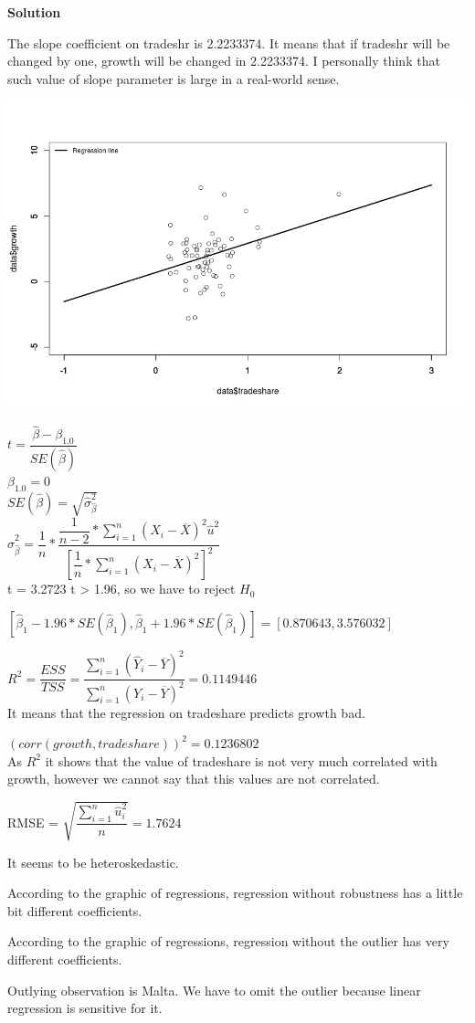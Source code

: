 \documentclass[12pt]{article}
\begin{document}
\textbf{Solution}

\begin{list}{)~}{}
\item
The slope coefficient on tradeshr is 2.2233374. It means that if tradeshr will be changed by one, growth will be changed in 2.2233374. I personally think that such value of slope parameter is large in a real-world sense.
\item
\includegraphics[width=1\textwidth]{Rplot.png}
\item
$t = \dfrac{\hat{\beta} - \beta_{1.0}}{SE(\hat{\beta})}$\\
$\beta_{1.0} = 0$\\
${SE(\hat{\beta})} = \sqrt{\hat{\sigma}^2_{\hat{\beta}}}$\\
$\hat{\sigma}^2_{\hat{\beta}} = \dfrac{1}{n} * \dfrac{\dfrac{1}{n-2} * \sum^{n}_{i = 1}(X_i - \overline{X})^2\hat{u}^2}{\left[\dfrac{1}{n} * \sum^{n}_{i = 1}(X_i-\overline{X})^2\right]^2}$\\
t = 3.2723 
t > 1.96, so we have to reject $H_0$
\item
$[\hat{\beta}_1 - 1.96*SE(\hat{\beta}_1),\hat{\beta}_1 + 1.96*SE(\hat{\beta}_1)] = [0.870643,3.576032]$
\item
$R^2 = \dfrac{ESS}{TSS} = \dfrac{\sum^{n}_{i=1}(\hat{Y}_i-\overline{Y})^2}{\sum^{n}_{i=1}(Y_i-\overline{Y})^2}=0.1149446$\\
It means that the regression on tradeshare predicts growth bad.
\item
$(corr(growth, tradeshare))^2 = 0.1236802$\\
As $R^2$
it shows that the value of tradeshare is not very much correlated with growth, however we cannot say that this values are not correlated.
\item
RMSE = $\sqrt{\dfrac{\sum^{n}_{i=1}\hat{u}^2_i}{n}}=1.7624$
\item
It seems to be heteroskedastic.
\item
According to the graphic of regressions, regression without robustness has a little bit different coefficients.
\item
According to the graphic of regressions, regression without the outlier has very different coefficients.
\item
Outlying observation is Malta. We have to omit the outlier because linear regression is sensitive for it.
\end{list}
\end{document}
